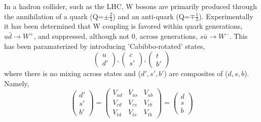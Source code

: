 In a hadron collider, such as the LHC, W bosons are primarily produced
through the annihilation of a quark (Q=$\pm\frac{2}{3}$) and an anti-quark (Q=$\mp\frac{1}{3}$). 
Experimentally it has been determined that W coupling is favored within quark generations,
$u\bar{d}\rightarrow W^{+}$,
and suppressed, although not 0, across generations, $s\bar{u}\rightarrow W^{-}$.
This has been paramaterized by introducing 'Cabibbo-rotated' states, 
\begin{equation}
\left(
    \begin{array}{c}
      u \\
      d' 
    \end{array}
  \right),
  \left(
    \begin{array}{c}
      c \\
      s' 
    \end{array}
  \right),
\left(
    \begin{array}{c}
      t \\
      b' 
    \end{array}
  \right)  
\end{equation}
where there is no mixing across states and ($d',s',b'$) are composites
of ($d,s,b$). Namely,
\begin{equation}
\left(
    \begin{array}{c}
      d' \\
      s'  \\
      b'
    \end{array}
  \right)
  =
  \begin{pmatrix}
  V_{ud} & V_{us} & V_{ub}\\
  V_{cd} & V_{cs} & V_{cb}\\
  V_{td} & V_{ts} & V_{tb}
  \end{pmatrix}
  =
  \left(
    \begin{array}{c}
      d \\
      s  \\
      b
    \end{array}
  \right)
\end{equation}
